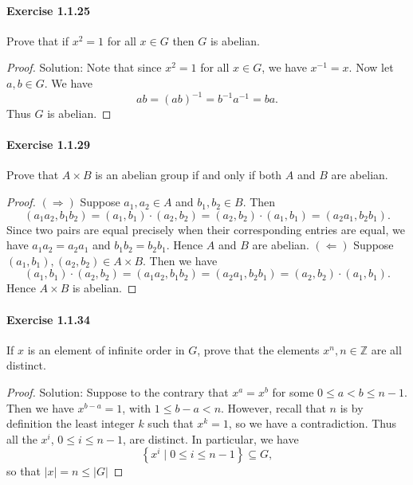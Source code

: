 \documentclass{article}
\theoremstyle{definition}
\begin{document}
\paragraph{Exercise 1.1.25} Prove that if $x^{2}=1$ for all $x \in G$ then $G$ is abelian.
\begin{proof}
    Solution: Note that since $x^2=1$ for all $x \in G$, we have $x^{-1}=x$. Now let $a, b \in G$. We have
$$
a b=(a b)^{-1}=b^{-1} a^{-1}=b a .
$$
Thus $G$ is abelian.
\end{proof}



\paragraph{Exercise 1.1.29} Prove that $A \times B$ is an abelian group if and only if both $A$ and $B$ are abelian.
\begin{proof}
    $(\Rightarrow)$ Suppose $a_1, a_2 \in A$ and $b_1, b_2 \in B$. Then
$$
\left(a_1 a_2, b_1 b_2\right)=\left(a_1, b_1\right) \cdot\left(a_2, b_2\right)=\left(a_2, b_2\right) \cdot\left(a_1, b_1\right)=\left(a_2 a_1, b_2 b_1\right) .
$$
Since two pairs are equal precisely when their corresponding entries are equal, we have $a_1 a_2=a_2 a_1$ and $b_1 b_2=b_2 b_1$. Hence $A$ and $B$ are abelian.
$(\Leftarrow)$ Suppose $\left(a_1, b_1\right),\left(a_2, b_2\right) \in A \times B$. Then we have
$$
\left(a_1, b_1\right) \cdot\left(a_2, b_2\right)=\left(a_1 a_2, b_1 b_2\right)=\left(a_2 a_1, b_2 b_1\right)=\left(a_2, b_2\right) \cdot\left(a_1, b_1\right) .
$$
Hence $A \times B$ is abelian.
\end{proof}



\paragraph{Exercise 1.1.34} If $x$ is an element of infinite order in $G$, prove that the elements $x^{n}, n \in \mathbb{Z}$ are all distinct.
\begin{proof}
    Solution: Suppose to the contrary that $x^a=x^b$ for some $0 \leq a<b \leq n-1$. Then we have $x^{b-a}=1$, with $1 \leq b-a<n$. However, recall that $n$ is by definition the least integer $k$ such that $x^k=1$, so we have a contradiction. Thus all the $x^i$, $0 \leq i \leq n-1$, are distinct. In particular, we have
$$
\left\{x^i \mid 0 \leq i \leq n-1\right\} \subseteq G,
$$
so that $|x|=n \leq|G|$
\end{proof}
\end{document}
